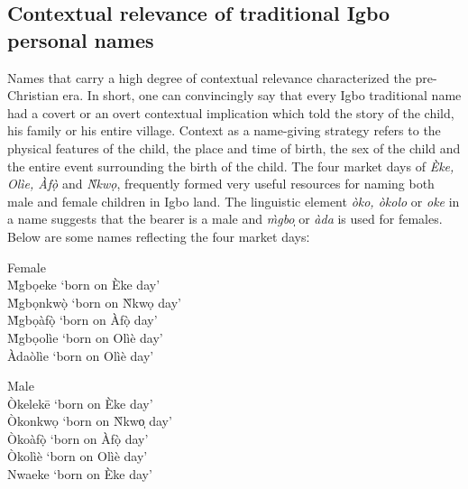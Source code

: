 \documentclass[output=paper]{langscibook}
\begin{document}
\subsection{Contextual relevance of traditional Igbo personal names}
Names that carry a high degree of contextual relevance characterized the pre-Christian era. In short, one can convincingly say that every Igbo traditional name had a covert or an overt contextual implication which told the story of the child, his family or his entire village. Context as a name-giving strategy refers to the physical features of the child, the place and time of birth, the sex of the child and the entire event surrounding the birth of the child. The four market days of \textit{Èke, Olìe, Àfọ̀ } and \textit{Ǹkwọ}, frequently formed very useful resources for naming both male and female children in Igbo land. The linguistic element \textit{òko, òkolo} or \textit{oke }in a name suggests that the bearer is a male and \textit{m̀gbo}̩ or \textit{àda} is used for females. Below are some names reflecting the four market daysː


\ea

Female\\
M̀gbọeke   `born on Èke day'\\
M̀gbọnkwọ̀    ‘born on Ǹkwọ day'\\
M̀gbọàfọ̀    ‘born on Àfọ̀ day’    \\      
M̀gbọolìe    ‘born on Olìè day’\\
Àdaòlìe        ‘born on Olìè day’\\   

\medskip

Male\\
Òkelekē  ‘born on Èke day’\\
Òkonkwọ    ‘born on Ǹkwo̩ day’\\
Òkoàfọ̀         ‘born on Àfọ̀ day’ \\ 
Òkolìè         ‘born on Olìè day'\\
Nwaeke        ‘born on Èke day’\\
\z
\end{document}
